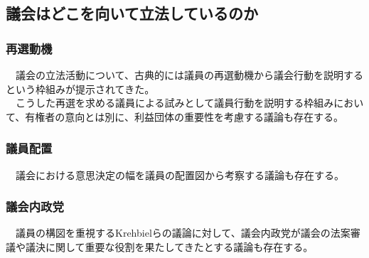 \documentclass{article}
\begin{document}
\subsection{議会はどこを向いて立法しているのか}
\subsubsection{再選動機}
　議会の立法活動について、古典的には議員の再選動機から議会行動を説明するという枠組みが提示されてきた。\citep*{Mayhew1974-jz}\\
　こうした再選を求める議員による試みとして議員行動を説明する枠組みにおいて、有権者の意向とは別に、利益団体の重要性を考慮する議論も存在する。\\

\subsubsection{議員配置}
　議会における意思決定の幅を議員の配置図から考察する議論も存在する。\citep*{Krehbiel2010-ob,Tsebelis2009-hf}
\subsubsection{議会内政党}
　議員の構図を重視するKrehbielらの議論に対して、議会内政党が議会の法案審議や議決に関して重要な役割を果たしてきたとする議論も存在する。\citep*{Cox2005-pn,Cox2007-xq,Rohde1991-da,Aldrich1995-xf}\\
\end{document}
